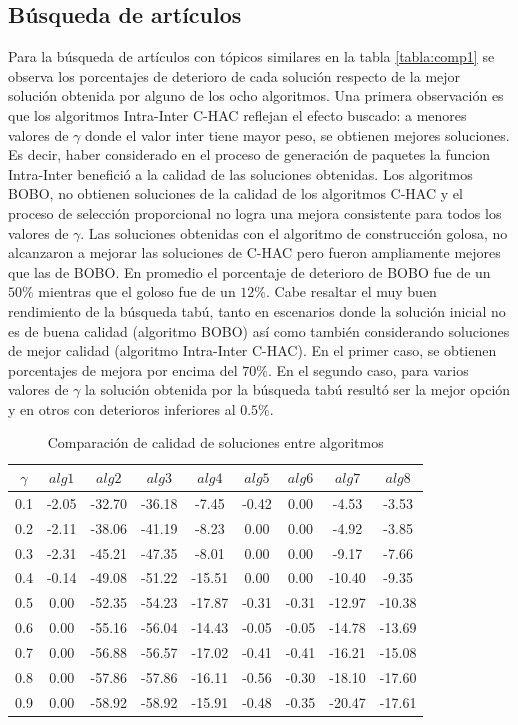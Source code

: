 \subsection{Búsqueda de artículos}
Para la búsqueda de artículos con tópicos similares en la tabla \ref{tabla:comp1} se observa los porcentajes de deterioro de cada solución respecto de la mejor solución obtenida por alguno de los ocho algoritmos. Una primera observación es que los algoritmos  Intra-Inter C-HAC reflejan el efecto buscado: a menores valores de $\gamma$ donde el valor inter tiene mayor peso, se obtienen mejores soluciones. Es decir, haber considerado en el proceso de generación de paquetes la funcion Intra-Inter benefició a la calidad de las soluciones obtenidas. Los algoritmos BOBO, no obtienen soluciones de la calidad de los algoritmos C-HAC y el proceso de selección proporcional no logra una mejora consistente para todos los valores de $\gamma$. Las soluciones obtenidas con el algoritmo de construcción golosa, no alcanzaron a mejorar las soluciones de C-HAC pero fueron ampliamente mejores que las de BOBO. En promedio el porcentaje de deterioro de BOBO fue de un $50\%$ mientras que el goloso fue de un $12\%$. 
Cabe resaltar el muy buen rendimiento de la búsqueda tabú, tanto en escenarios donde la solución inicial no es de buena calidad (algoritmo BOBO) así como también considerando soluciones de mejor calidad (algoritmo Intra-Inter C-HAC). En el primer caso, se obtienen porcentajes de mejora por encima del $70\%$. En el segundo caso, para varios valores de $\gamma$ la solución obtenida por la búsqueda tabú resultó ser la mejor opción y en otros con deterioros inferiores al $0.5\%$.
\begin{table}[H]
\begin{center}
\begin{tabular}{|c|c|c|c|c|c|c|c|c|}
\hline
$\gamma$&$alg1$&$alg2$&$alg3$&$alg4$&$alg5$&$alg6$&$alg7$&$alg8$ \\ \hline
0.1 & -2.05 & -32.70 & -36.18 & -7.45 & -0.42 & 0.00 & -4.53 & -3.53 \\
0.2 & -2.11 & -38.06 & -41.19 & -8.23 & 0.00 & 0.00 & -4.92 & -3.85 \\
0.3 & -2.31 & -45.21 & -47.35 & -8.01 & 0.00 & 0.00 & -9.17 & -7.66 \\
0.4 & -0.14 & -49.08 & -51.22 & -15.51 & 0.00 & 0.00 & -10.40 & -9.35 \\
0.5 & 0.00 & -52.35 & -54.23 & -17.87 & -0.31 & -0.31 & -12.97 & -10.38 \\
0.6 & 0.00 & -55.16 & -56.04 & -14.43 & -0.05 & -0.05 & -14.78 & -13.69 \\
0.7 & 0.00 & -56.88 & -56.57 & -17.02 & -0.41 & -0.41 & -16.21 & -15.08 \\
0.8 & 0.00 & -57.86 & -57.86 & -16.11 & -0.56 & -0.30 & -18.10 & -17.60 \\
0.9 & 0.00 & -58.92 & -58.92 & -15.91 & -0.48 & -0.35 & -20.47 & -17.61 \\ \hline 
\end{tabular}
\caption{Comparación de calidad de soluciones entre algoritmos} 
\label{tabla:comp2}
\end{center}
\end{table}

